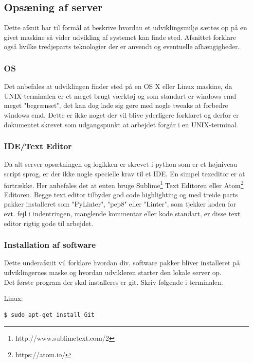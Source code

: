 \subsection{Opsæning af server}
Dette afsnit har til formål at beskrive hvordan et udviklingsmiljø sættes op på en givet maskine så vider udvikling af systemet kan finde sted. Afsnittet forklare også hvilke tredjeparts teknologier der er anvendt og eventuelle afhængigheder.

\subsubsection*{OS}
Det anbefales at udviklingen finder sted på en OS X eller Linux maskine, da UNIX-terminalen er et meget brugt værktøj og som standart er windows cmd meget "begrænset", det kan dog lade sig gøre med nogle tweaks at forbedre windows cmd. Dette er ikke noget der vil blive yderligere forklaret og derfor er dokumentet skrevet som udgangspunkt at arbejdet forgår i en UNIX-terminal.

\subsubsection*{IDE/Text Editor}
Da alt server opsætningen og logikken er skrevet i python som er et højniveau script sprog, er der ikke nogle specielle krav til et IDE. En simpel texeditor er at fortrække. Her anbefales det at enten bruge Sublime\footnote{http://www.sublimetext.com/2} Text Editoren eller Atom\footnote{https://atom.io/} Editoren. Begge text editor tilbyder god code highlighting og med treide parts pakker installeret som "PyLinter", "pep8" eller "Linter", som tjekker koden for evt. fejl i indentringen, manglende kommentar eller kode standart, er disse text editor rigtig gode til arbejdet.

\subsubsection*{Installation af software}
Dette underafsnit vil forklare hvordan div. software pakker bliver installeret på udviklingernes maske og hvordan udvikleren starter den lokale server op. \\
Det første program der skal installeres er git. Skriv følgende i terminalen.

Linux:
\begin{lstlisting}[language=bash]
	$ sudo apt-get install Git
\end{lstlisting}

